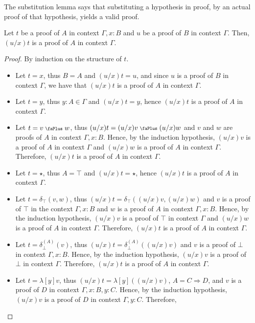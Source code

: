 \documentclass[screen, sigconf,authorversion,nonacm]{acmart}
\theoremstyle{acmdefinition}
\numberwithin{equation}{section}
\newcommand\abstr[1]{[#1]}
\newcommand\elimtop{\delta_{\top}}
\newcommand\elimbot[1]{\delta^{(#1)}_{\bot}}
\newcommand\plus{\mathrel{\text{\normalfont\scalebox{0.7}{\faPlus}}}}
\begin{document}
The substitution lemma says that substituting a hypothesis in proof, by an
actual proof of that hypothesis, yields a valid proof.
\begin{proposition}
  [Substitution]
  \label{prop:subst}
  Let $t$ be a proof of $A$ in context $\Gamma,x:B$ and $u$ be a proof of $B$
  in context $\Gamma$.  Then, $(u/x)t$ is a proof of $A$ in context $\Gamma$.
\end{proposition}
\begin{proof}
  By induction on the structure of $t$.
  \begin{itemize}
    \item Let $t=x$, thus $B=A$ and $(u/x)t = u$, and since $u$ is a proof of
      $B$ in context $\Gamma$, we have that $(u/x)t$ is a proof of $A$ in
      context $\Gamma$.
    \item Let $t=y$, thus $y:A\in\Gamma$ and $(u/x)t=y$, hence $(u/x)t$ is a
      proof of $A$ in context $\Gamma$.
    \item Let $t=v \plus w$, 
      thus $(u/x)t=(u/x)v\plus (u/x)w$ and
      $v$ and $w$ are proofs of $A$ in context $\Gamma,x:B$. Hence, by the
      induction hypothesis,
      $(u/x)v$ is a proof of $A$ in context $\Gamma$ and
      $(u/x)w$ is a proof of $A$ in context $\Gamma$. Therefore, 
      $(u/x)t$ is a proof of $A$ in context $\Gamma$.
    \item Let $t=\star$, thus $A=\top$ and $(u/x)t=\star$, hence $(u/x)t$ is a
      proof of $A$ in context $\Gamma$.
    \item Let $t= \elimtop(v,w)$,  
      thus $(u/x)t=\elimtop((u/x)v,(u/x)w)$ and
      $v$ is a proof of $\top$ in the context $\Gamma,x:B$ and $w$ is a proof of $A$ in context $\Gamma,x:B$. Hence, by the induction
      hypothesis,
      $(u/x)v$ is a proof of $\top$ in context $\Gamma$ and
      $(u/x)w$ is a proof of $A$ in context $\Gamma$. Therefore, 
      $(u/x)t$ is a proof of $A$ in context $\Gamma$.
    \item Let $t= \elimbot{A}(v)$, 
      thus $(u/x)t=\elimbot{A}((u/x)v)$ and
      $v$ is a proof of $\bot$ in context $\Gamma,x:B$.
      Hence, by the induction hypothesis,
      $(u/x)v$ is a proof of $\bot$ in context $\Gamma$. Therefore,
      $(u/x)t$ is a proof of $A$ in context $\Gamma$.
    \item Let $t= \lambda \abstr{y}v$,
      thus $(u/x)t=\lambda\abstr{y}((u/x)v)$, $A=C\Rightarrow D$, and
      $v$ is a proof of $D$ in context $\Gamma,x:B,y:C$.
      Hence, by the induction hypothesis,
      $(u/x)v$ is a proof of $D$ in context $\Gamma,y:C$. Therefore,

\end{itemize}
\end{proof}
\end{document}
